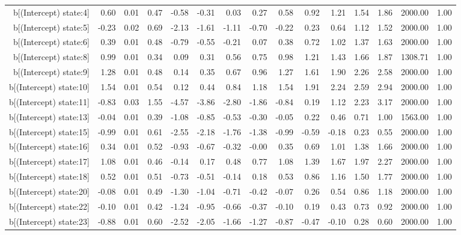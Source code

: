 \begin{table}[ht]
\begin{tabular}{rrrrrrrrrrrrrrr}
  b[(Intercept) state:4] & 0.60 & 0.01 & 0.47 & -0.58 & -0.31 & 0.03 & 0.27 & 0.58 & 0.92 & 1.21 & 1.54 & 1.86 & 2000.00 & 1.00 \\ 
  b[(Intercept) state:5] & -0.23 & 0.02 & 0.69 & -2.13 & -1.61 & -1.11 & -0.70 & -0.22 & 0.23 & 0.64 & 1.12 & 1.52 & 2000.00 & 1.00 \\ 
  b[(Intercept) state:6] & 0.39 & 0.01 & 0.48 & -0.79 & -0.55 & -0.21 & 0.07 & 0.38 & 0.72 & 1.02 & 1.37 & 1.63 & 2000.00 & 1.00 \\ 
  b[(Intercept) state:8] & 0.99 & 0.01 & 0.34 & 0.09 & 0.31 & 0.56 & 0.75 & 0.98 & 1.21 & 1.43 & 1.66 & 1.87 & 1308.71 & 1.00 \\ 
  b[(Intercept) state:9] & 1.28 & 0.01 & 0.48 & 0.14 & 0.35 & 0.67 & 0.96 & 1.27 & 1.61 & 1.90 & 2.26 & 2.58 & 2000.00 & 1.00 \\ 
  b[(Intercept) state:10] & 1.54 & 0.01 & 0.54 & 0.12 & 0.44 & 0.84 & 1.18 & 1.54 & 1.91 & 2.24 & 2.59 & 2.94 & 2000.00 & 1.00 \\ 
  b[(Intercept) state:11] & -0.83 & 0.03 & 1.55 & -4.57 & -3.86 & -2.80 & -1.86 & -0.84 & 0.19 & 1.12 & 2.23 & 3.17 & 2000.00 & 1.00 \\ 
  b[(Intercept) state:13] & -0.04 & 0.01 & 0.39 & -1.08 & -0.85 & -0.53 & -0.30 & -0.05 & 0.22 & 0.46 & 0.71 & 1.00 & 1563.00 & 1.00 \\ 
  b[(Intercept) state:15] & -0.99 & 0.01 & 0.61 & -2.55 & -2.18 & -1.76 & -1.38 & -0.99 & -0.59 & -0.18 & 0.23 & 0.55 & 2000.00 & 1.00 \\ 
  b[(Intercept) state:16] & 0.34 & 0.01 & 0.52 & -0.93 & -0.67 & -0.32 & -0.00 & 0.35 & 0.69 & 1.01 & 1.38 & 1.66 & 2000.00 & 1.00 \\ 
  b[(Intercept) state:17] & 1.08 & 0.01 & 0.46 & -0.14 & 0.17 & 0.48 & 0.77 & 1.08 & 1.39 & 1.67 & 1.97 & 2.27 & 2000.00 & 1.00 \\ 
  b[(Intercept) state:18] & 0.52 & 0.01 & 0.51 & -0.73 & -0.51 & -0.14 & 0.18 & 0.53 & 0.86 & 1.16 & 1.50 & 1.77 & 2000.00 & 1.00 \\ 
  b[(Intercept) state:20] & -0.08 & 0.01 & 0.49 & -1.30 & -1.04 & -0.71 & -0.42 & -0.07 & 0.26 & 0.54 & 0.86 & 1.18 & 2000.00 & 1.00 \\ 
  b[(Intercept) state:22] & -0.10 & 0.01 & 0.42 & -1.24 & -0.95 & -0.66 & -0.37 & -0.10 & 0.19 & 0.43 & 0.73 & 0.92 & 2000.00 & 1.00 \\ 
  b[(Intercept) state:23] & -0.88 & 0.01 & 0.60 & -2.52 & -2.05 & -1.66 & -1.27 & -0.87 & -0.47 & -0.10 & 0.28 & 0.60 & 2000.00 & 1.00 \\ 

\end{tabular}
\end{table}
